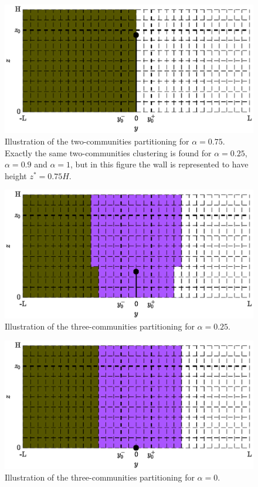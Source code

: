 \begin{figure}[!htp]
	\centering
	\includegraphics[width = .7\textwidth]{fig/problem2box/cluster_a75_2_.eps}
	\caption{Illustration of the two-communities partitioning for $\alpha = 0.75$. Exactly the same two-communities clustering is found for $\alpha = 0.25$, $\alpha = 0.9$ and $\alpha = 1$, but in this figure the wall is represented to have height $z^* = 0.75H$.}
	\label{fig:cluster_a75_2}
\end{figure}

\begin{figure}[!htp]
	\centering
	\includegraphics[width = .7\textwidth]{fig/problem2box/cluster_a25_3_.eps}
	\caption{Illustration of the three-communities partitioning for $\alpha = 0.25$.}
	\label{fig:cluster_a25_3}
\end{figure}

\begin{figure}[!htp]
	\centering
	\includegraphics[width = .7\textwidth]{fig/problem2box/cluster_a0_3_.eps}
	\caption{Illustration of the three-communities partitioning for $\alpha = 0$.}
	\label{fig:cluster_a0_3}
\end{figure}

